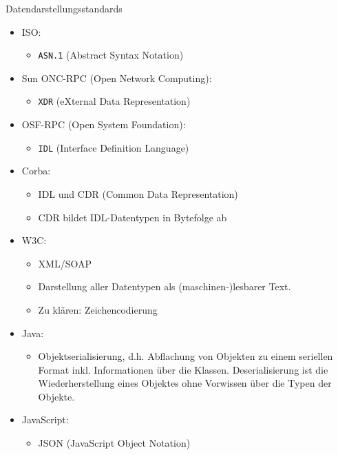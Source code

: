 \begin{example}{Datendarstellungsstandards}
    \begin{itemize}
        \item ISO:
              
              \begin{itemize}
                  \item \texttt{ASN.1} (Abstract Syntax Notation)
              \end{itemize}
        \item Sun ONC-RPC (Open Network Computing):
              
              \begin{itemize}
                  \item \texttt{XDR} (eXternal Data Representation)
              \end{itemize}
        \item OSF-RPC (Open System Foundation):
              
              \begin{itemize}
                  \item \texttt{IDL} (Interface Definition Language)
              \end{itemize}
        \item Corba:
              
              \begin{itemize}
                  \item IDL und CDR (Common Data Representation)
                  \item CDR bildet IDL-Datentypen in Bytefolge ab
              \end{itemize}
        \item W3C:
              
              \begin{itemize}
                  \item XML/SOAP
                  \item Darstellung aller Datentypen als (maschinen-)lesbarer Text.
                  \item Zu klären: Zeichencodierung
              \end{itemize}
        \item Java:
              
              \begin{itemize}
                  \item Objektserialisierung, d.h. Abflachung von Objekten zu einem seriellen Format inkl. Informationen über die Klassen.
                        Deserialisierung ist die Wiederherstellung eines Objektes ohne Vorwissen über die Typen der Objekte.
              \end{itemize}
        \item JavaScript:
              
              \begin{itemize}
                  \item JSON (JavaScript Object Notation)
              \end{itemize}
    \end{itemize}
\end{example}

